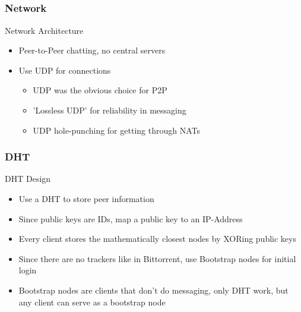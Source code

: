 \documentclass{mybeamer}
\begin{document}
    \subsection{}
    \begin{frame}
        \frametitle{Network}
        \begin{block}{Network Architecture}
                \begin{itemize}
                \item Peer-to-Peer chatting, no central servers
                \item Use UDP for connections
                \begin{itemize}
                    \item UDP was the obvious choice for P2P
                    \item 'Lossless UDP' for reliability in messaging
                    \item UDP hole-punching for getting through NATs
                \end{itemize}
            \end{itemize}
        \end{block}
    \end{frame}
    \begin{frame}
        \frametitle{DHT}
        \begin{block}{DHT Design}
            \begin{itemize}
                \item Use a DHT to store peer information
                \item Since public keys are IDs, map a public key to an IP-Address
                \item Every client stores the mathematically closest nodes by XORing public keys
                \item Since there are no trackers like in Bittorrent, use Bootstrap nodes for initial login
                \item Bootstrap nodes are clients that don't do messaging, only DHT work, but any client can serve as a bootstrap node
            \end{itemize}
        \end{block}
    \end{frame}
    
\end{document}
